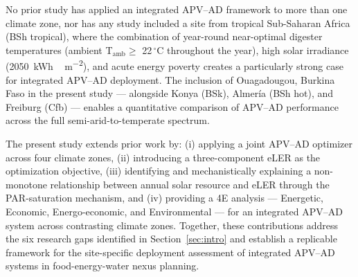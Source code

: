 No prior study has applied an integrated APV--AD framework to more than
one climate zone, nor has any study included a site from tropical
Sub-Saharan Africa (BSh tropical), where the combination of year-round
near-optimal digester temperatures (ambient T$_{\text{amb}} \geq$
22\,$^{\circ}$C throughout the year), high solar irradiance
(\SI{2050}{kWh\,m^{-2}}), and acute energy poverty creates a
particularly strong case for integrated APV--AD deployment. The inclusion of
Ouagadougou, Burkina Faso in the present study --- alongside Konya
(BSk), Almer\'{i}a (BSh hot), and Freiburg (Cfb) --- enables a quantitative comparison of APV--AD performance across the full
semi-arid-to-temperate spectrum.

The present study extends prior work by:
(i) applying a joint APV--AD optimizer across four climate zones,
(ii) introducing a three-component eLER as the optimization objective,
(iii) identifying and mechanistically explaining a non-monotone relationship
between annual solar resource and eLER through the PAR-saturation
mechanism, and
(iv) providing a 4E analysis --- Energetic, Economic, Energo-economic,
and Environmental --- for an integrated APV--AD system across
contrasting climate zones. Together, these contributions address
the six research gaps identified in Section~\ref{sec:intro} and
establish a replicable framework for the site-specific deployment
assessment of integrated APV--AD systems in food-energy-water nexus
planning.
